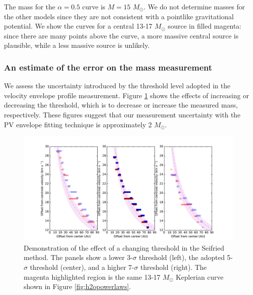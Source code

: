 \documentclass[twocolumn]{aastex61}
\newcommand{\msun}{\ensuremath{M_{\odot}}\xspace}			%
\begin{document}


The mass for the $\alpha=0.5$ curve is $M=15$ \msun.  We do not determine
masses for the other models since they are not consistent with a pointlike
gravitational potential.  We show the curves for a central 13-17 \msun source
in filled magenta: since there are many points above the curve, a more massive
central source is plausible, while a less massive source is unlikely.

\subsubsection{An estimate of the error on the mass measurement}
\label{sec:errorestimate}
We  assess the uncertainty introduced by the threshold level adopted in the
velocity envelope profile measurement.  Figure \ref{fig:seifreidthresholderror}
shows the effects of increasing or decreasing the threshold, which is to
decrease or increase the measured mass, respectively.  These figures suggest
that our measurement uncertainty with the PV envelope fitting technique  is
approximately 2 \msun.


\begin{figure}[!htp]
\includegraphics[scale=1,width=7.5in]{figures/outerenvelope_velocity_thresholds_H2O_kepler_SeifriedPlot_0.01arcsec.pdf}
\caption{Demonstration of the effect of a changing threshold in the Seifried method.
The panels show a lower 3-$\sigma$ threshold (left), the adopted 5-$\sigma$
threshold (center), and a higher 7-$\sigma$ threshold (right).  
The magenta highlighted region is the same 13-17 \msun Keplerian curve shown
in Figure \ref{fig:h2opowerlaws}.  
}
\label{fig:seifreidthresholderror}
\end{figure}
\end{document}
